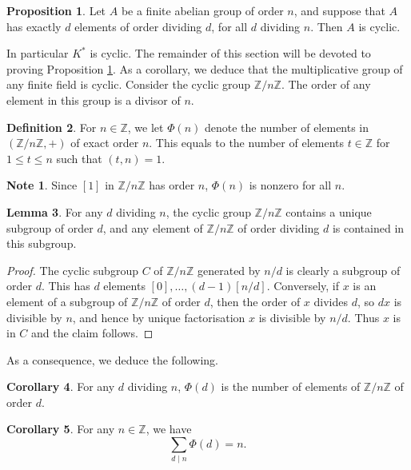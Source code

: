 \documentclass{article}
\newcommand{\Z}{\mathbb{Z}}
\newcommand{\rb}[1]{\left( #1 \right)}
\renewcommand{\sb}[1]{\left[ #1 \right]}
\theoremstyle{definition}\newtheorem{definition}{Definition}[subsection]
\theoremstyle{definition}\newtheorem{remark}[definition]{Remark}
\theoremstyle{definition}\newtheorem*{example}{Example}
\theoremstyle{definition}\newtheorem*{note}{Note}
\newtheorem{proposition}[definition]{Proposition}
\newtheorem{lemma}[definition]{Lemma}
\newtheorem{corollary}[definition]{Corollary}
\begin{document}
\begin{proposition}
\label{prop:6.4.1}
Let $ A $ be a finite abelian group of order $ n $, and suppose that $ A $ has exactly $ d $ elements of order dividing $ d $, for all $ d $ dividing $ n $. Then $ A $ is cyclic.
\end{proposition}

In particular $ K^* $ is cyclic. The remainder of this section will be devoted to proving Proposition \ref{prop:6.4.1}. As a corollary, we deduce that the multiplicative group of any finite field is cyclic. Consider the cyclic group $ \Z / n\Z $. The order of any element in this group is a divisor of $ n $.

\begin{definition}
For $ n \in \Z $, we let $ \Phi\rb{n} $ denote the number of elements in $ \rb{\Z / n\Z, +} $ of exact order $ n $. This equals to the number of elements $ t \in \Z $ for $ 1 \le t \le n $ such that $ \rb{t, n} = 1 $.
\end{definition}

\begin{note}
Since $ \sb{1} $ in $ \Z / n\Z $ has order $ n $, $ \Phi\rb{n} $ is nonzero for all $ n $.
\end{note}

\begin{lemma}
For any $ d $ dividing $ n $, the cyclic group $ \Z / n\Z $ contains a unique subgroup of order $ d $, and any element of $ \Z / n\Z $ of order dividing $ d $ is contained in this subgroup.
\end{lemma}

\begin{proof}
The cyclic subgroup $ C $ of $ \Z / n\Z $ generated by $ n / d $ is clearly a subgroup of order $ d $. This has $ d $ elements $ \sb{0}, \dots, \rb{d - 1}\sb{n / d} $. Conversely, if $ x $ is an element of a subgroup of $ \Z / n\Z $ of order $ d $, then the order of $ x $ divides $ d $, so $ dx $ is divisible by $ n $, and hence by unique factorisation $ x $ is divisible by $ n / d $. Thus $ x $ is in $ C $ and the claim follows.
\end{proof}

As a consequence, we deduce the following.

\begin{corollary}
For any $ d $ dividing $ n $, $ \Phi\rb{d} $ is the number of elements of $ \Z / n\Z $ of order $ d $.
\end{corollary}

\begin{corollary}
\label{cor:6.4.3}
For any $ n \in \Z $, we have
$$ \sum_{d \mid n} \Phi\rb{d} = n. $$
\end{corollary}
\end{document}
